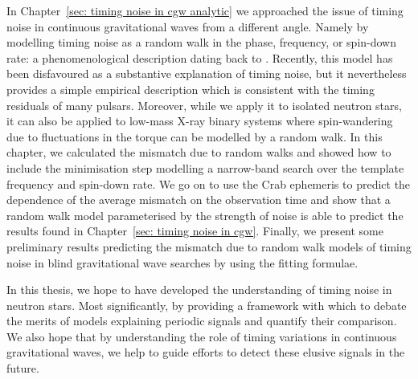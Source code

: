 \documentclass[twoside, 11pt]{thesis}
\begin{document}
In Chapter~\ref{sec: timing noise in cgw analytic} we approached the issue of
timing noise in continuous gravitational waves from a different angle. Namely
by modelling timing noise as a random walk in the phase, frequency, or
spin-down rate: a phenomenological description dating back to
\citet{Boynton1972}. Recently, this model has been disfavoured
\citep{Hobbs2010} as a substantive explanation of timing noise, but it
nevertheless provides a simple empirical description which is consistent with
the timing residuals of many pulsars. Moreover, while we apply it to isolated
neutron stars, it can also be applied to low-mass X-ray binary systems where
spin-wandering due to fluctuations in the torque can be modelled by a random
walk. In this chapter, we calculated the mismatch due to random walks and
showed how to include the minimisation step modelling a narrow-band search over
the template frequency and spin-down rate. We go on to use the Crab ephemeris
to predict the dependence of the average mismatch on the observation time and
show that a random walk model parameterised by the strength of noise is able to
predict the results found in Chapter~\ref{sec: timing noise in cgw}. Finally,
we present some preliminary results predicting the mismatch due to random walk
models of timing noise in blind gravitational wave searches by using the
\citet{Cordes1989} fitting formulae.

In this thesis, we hope to have developed the understanding of timing noise in
neutron stars. Most significantly, by providing a framework with which to debate
the merits of models explaining periodic signals and quantify their comparison.
We also hope that by understanding the role of timing variations in continuous
gravitational waves, we help to guide efforts to detect these elusive signals
in the future.







\end{document}
